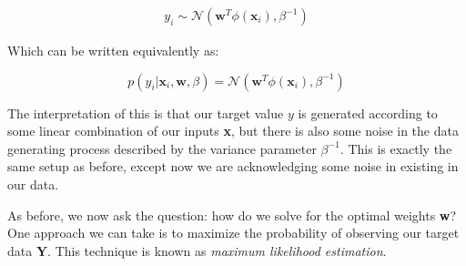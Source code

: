 \begin{align*}
    y_{i} \sim \mathcal{N}(\textbf{w}^{T}\phi(\textbf{x}_{i}), \beta^{-1})
\end{align*}

Which can be written equivalently as:

\begin{equation} \label{normal-over-w}
    p(y_{i} | \textbf{x}_{i}, \textbf{w}, \beta) = \mathcal{N}(\textbf{w}^{T}\phi(\textbf{x}_{i}), \beta^{-1})
\end{equation}

The interpretation of this is that our target value $y$ is generated according to some linear combination of our inputs \textbf{x}, but there is also some noise in the data generating process described by the variance parameter $\beta^{-1}$. This is exactly the same setup as before, except now we are acknowledging some noise in existing in our data.


As before, we now ask the question: how do we solve for the optimal weights \textbf{w}? One approach we can take is to maximize the probability of observing our target data \textbf{Y}. This technique is known as \textit{maximum likelihood estimation}.

